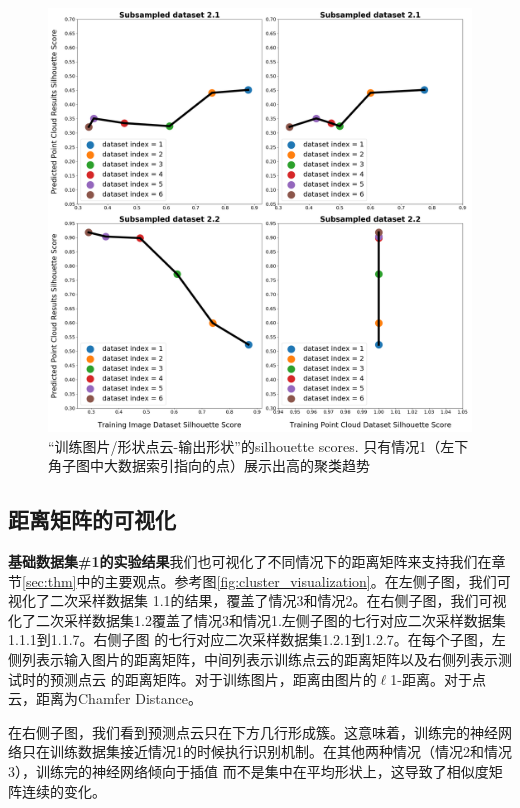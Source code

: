 \documentclass[bachelor, nocolorlinks, printoneside]{seuthesis} %
\begin{document}
\begin{Main}
\begin{figure}[h!]
    \centering
    \includegraphics[width=.95\textwidth]{figs/silhouette-dataset-2.png}
    \caption{\small “训练图片/形状点云-输出形状”的silhouette scores. 只有情况1（左下角子图中大数据索引指向的点）展示出高的聚类趋势}
    \label{fig:silhouette-dataset-2.png}
\end{figure}

\subsection{距离矩阵的可视化}

\textbf{基础数据集\#1的实验结果}我们也可视化了不同情况下的距离矩阵来支持我们在章节\ref{sec:thm}中的主要观点。参考图\ref{fig:cluster_visualization}。在左侧子图，我们可视化了二次采样数据集
1.1的结果，覆盖了情况3和情况2。在右侧子图，我们可视化了二次采样数据集1.2覆盖了情况3和情况1.左侧子图的七行对应二次采样数据集1.1.1到1.1.7。右侧子图
的七行对应二次采样数据集1.2.1到1.2.7。在每个子图，左侧列表示输入图片的距离矩阵，中间列表示训练点云的距离矩阵以及右侧列表示测试时的预测点云
的距离矩阵。对于训练图片，距离由图片的$\ell$1-距离。对于点云，距离为Chamfer Distance。

在右侧子图，我们看到预测点云只在下方几行形成簇。这意味着，训练完的神经网络只在训练数据集接近情况1的时候执行识别机制。在其他两种情况（情况2和情况3），训练完的神经网络倾向于插值
而不是集中在平均形状上，这导致了相似度矩阵连续的变化。



\end{Main}
\end{document}
